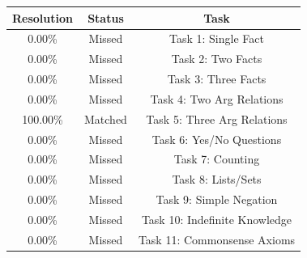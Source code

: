 \begin{table}[h]
\centering
\begin{tabular}{ |c|c|c| }
\hline
Resolution & Status & Task \\
\hline
0.00\% & Missed & Task 1: Single Fact \\
\hline
0.00\% & Missed & Task 2: Two Facts \\
\hline
0.00\% & Missed & Task 3: Three Facts \\
\hline
0.00\% & Missed & Task 4: Two Arg Relations \\
\hline
100.00\% & Matched & Task 5: Three Arg Relations \\
\hline
0.00\% & Missed & Task 6: Yes/No Questions \\
\hline
0.00\% & Missed & Task 7: Counting \\
\hline
0.00\% & Missed & Task 8: Lists/Sets \\
\hline
0.00\% & Missed & Task 9: Simple Negation \\
\hline
0.00\% & Missed & Task 10: Indefinite Knowledge \\
\hline
0.00\% & Missed & Task 11: Commonsense Axioms \\
\hline
\end{tabular}
\end{table}
